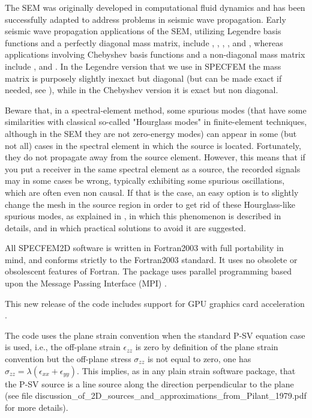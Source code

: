 The SEM was originally developed in computational fluid dynamics \citep{Pat84,MaPa89}
and has been successfully adapted to address problems in seismic wave propagation.
Early seismic wave propagation applications of the SEM, utilizing Legendre basis functions and a
perfectly diagonal mass matrix, include \cite{CoJoTo93}, \cite{Kom97},
\cite{FaMaPaQu97}, \cite{CaGa97}, \cite{KoVi98} and \cite{KoTr99},
whereas applications involving Chebyshev basis functions and a non-diagonal mass matrix
include \cite{SePr94}, \cite{PrCaSe94} and \cite{SePrPr95}.
In the Legendre version that we use in SPECFEM the mass matrix is purposely slightly inexact but diagonal (but can be made exact if needed, see \cite{Teu15}),
while in the Chebyshev version it is exact but non diagonal.\newline

Beware that, in a spectral-element method, some spurious modes (that have some similarities with classical so-called "Hourglass modes" in finite-element techniques,
although in the SEM they are not zero-energy modes) can appear in some (but not all) cases in the spectral element in which the source is located.
Fortunately, they do not propagate away from the source element.
However, this means that if you put a receiver in the same spectral element as a source, the recorded signals may in some cases be wrong, typically exhibiting some spurious
oscillations, which are often even non causal.
If that is the case, an easy option is to slightly change the mesh in the source region in order to get rid of these Hourglass-like spurious modes,
as explained in \cite{DuLiScGa14}, in which this phenomenon is described in details, and in which practical solutions to avoid it are suggested.\newline

All SPECFEM2D software is written in Fortran2003 with full portability
in mind, and conforms strictly to the Fortran2003 standard. It uses
no obsolete or obsolescent features of Fortran. The package uses
parallel programming based upon the Message Passing Interface (MPI)
\citep{GrLuSk94,Pac97}.\newline

This new release of the code includes support for GPU graphics card acceleration \citep{Kom11,MiKo10,KoMiEr09,KoErGoMi10}.\newline

The code uses the plane strain convention when the standard P-SV equation case is used, i.e.,
the off-plane strain $\epsilon_{zz}$ is zero by definition of the plane strain convention but the off-plane stress $\sigma_{zz}$ is not equal to zero,
one has $\sigma_{zz} = \lambda (\epsilon_{xx} + \epsilon_{yy})$.
This implies, as in any plain strain software package, that the P-SV source is a line source along the direction perpendicular to the plane (see file
discussion\_of\_2D\_sources\_and\_approximations\_from\_Pilant\_1979.pdf for more details).

